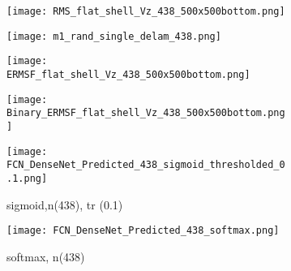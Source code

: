 	\begin{figure} [h!]
		\centering
		\begin{subfigure}[b]{0.47\textwidth}
			\centering
			\texttt{[image: RMS\_flat\_shell\_Vz\_438\_500x500bottom.png]}
			\caption{}
			\label{fig:dispersion15deg_direct}
		\end{subfigure}
		\hfill
			\begin{subfigure}[b]{0.47\textwidth}
			\centering
			\texttt{[image: m1\_rand\_single\_delam\_438.png]}
			\caption{}
			\label{fig:m1_rand_single_delam_438}
		\end{subfigure}
		\hfill
		\begin{subfigure}[b]{0.47\textwidth}
			\centering
			\texttt{[image: ERMSF\_flat\_shell\_Vz\_438\_500x500bottom.png]}
			\caption{}
			\label{fig:ERMSF_flat_shell_Vz_438}
		\end{subfigure}
		\hfill
		\begin{subfigure}[b]{0.47\textwidth}
			\centering
			\texttt{[image: Binary\_ERMSF\_flat\_shell\_Vz\_438\_500x500bottom.png]}
			\caption{}
			\label{fig:dispersion75deg_direct}
		\end{subfigure}
		\hfill
		\begin{subfigure}[b]{0.47\textwidth}
			\centering
		\texttt{[image: FCN\_DenseNet\_Predicted\_438\_sigmoid\_thresholded\_0.1.png]}
		\caption{sigmoid,n(438), tr (0.1)}
		\label{fig:predict_438_sigmoid_tr_0.1}
		\end{subfigure}
		\hfill
		\begin{subfigure}[b]{0.47\textwidth}
			\centering
			\texttt{[image: FCN\_DenseNet\_Predicted\_438\_softmax.png]}
			\caption{softmax, n(438)}
			\label{fig:predict_438_softmax}
		\end{subfigure}

		\caption{}
		\label{fig:predictions}
	\end{figure} 
